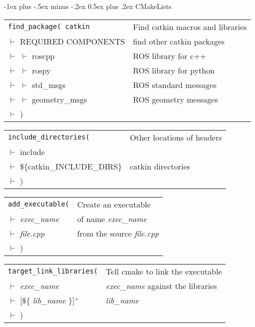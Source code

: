 \documentclass[10pt,letterpaper]{article}
\makeatletter
\renewcommand\section{\@startsection{section}{1}{0mm}%
                                {-1ex plus -.5ex minus -.2ex}%
                                {0.5ex plus .2ex}%
                                {\normalfont\large\bfseries}
                      }%
\makeatother
\begin{document}
\begin{multicols}{3}
\section{CMakeLists}
\begin{tabular}{@{}ll@{}}
\verb!find_package( catkin! & Find catkin macros and libraries \\
$\vdash $ REQUIRED COMPONENTS & find other catkin packages \\
$\vdash $ $\vdash $ roscpp & ROS library for c++  \\
$\vdash $ $\vdash $ rospy & ROS library for python  \\
$\vdash $ $\vdash $ std\_msgs & ROS standard messages  \\
$\vdash $ $\vdash $ geometry\_msgs & ROS geometry messages  \\
$\vdash $ ) &  \\
\end{tabular}

\begin{tabular}{@{}ll@{}}
\verb!include_directories(! & Other locations of headers \\
$\vdash $ include & \\
$\vdash $ \$\{catkin\_INCLUDE\_DIRS\} & catkin directories \\
$\vdash $ ) & \\
\end{tabular}

\begin{tabular}{@{}ll@{}}
\verb!add_executable(! & Create an executable \\
$\vdash $ \textit{exec\_name} & of name \textit{exec\_name}  \\
$\vdash $ \textit{file.cpp} & from the source \textit{file.cpp}  \\
$\vdash $ ) &  \\
\end{tabular}

\begin{tabular}{@{}ll@{}}
\verb!target_link_libraries(! & Tell cmake to link the executable \\
$\vdash $ \textit{exec\_name} & \textit{exec\_name} against the libraries \\
$\vdash $ [\$\{ \textit{lib\_name} \}]$^+$ &  \textit{lib\_name} \\
$\vdash $ ) &  \\
\end{tabular}



\end{multicols}
\end{document}
